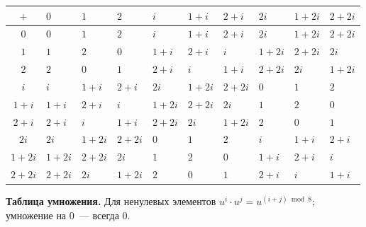 \documentclass[12pt,a4paper]{article}
\begin{document}
    \begin{center}
    	{\footnotesize
    	\begin{xltabular}{\textwidth}{|c|X|X|X|X|X|X|X|X|X|}
    		\hline
    		$+$ & $0$ & $1$ & $2$ & $i$ & $1+i$ & $2+i$ & $2i$ & $1+2i$ & $2+2i$\\
    		\hline
    		$0$ & $0$ & $1$ & $2$ & $i$ & $1+i$ & $2+i$ & $2i$ & $1+2i$ & $2+2i$\\
    		\hline
    		$1$ & $1$ & $2$ & $0$ & $1+i$ & $2+i$ & $i$ & $1+2i$ & $2+2i$ & $2i$\\
    		\hline
    		$2$ & $2$ & $0$ & $1$ & $2+i$ & $i$ & $1+i$ & $2+2i$ & $2i$ & $1+2i$\\
    		\hline
    		$i$ & $i$ & $1+i$ & $2+i$ & $2i$ & $1+2i$ & $2+2i$ & $0$ & $1$ & $2$\\
    		\hline
    		$1+i$ & $1+i$ & $2+i$ & $i$ & $1+2i$ & $2+2i$ & $2i$ & $1$ & $2$ & $0$\\
    		\hline
    		$2+i$ & $2+i$ & $i$ & $1+i$ & $2+2i$ & $2i$ & $1+2i$ & $2$ & $0$ & $1$\\
    		\hline
    		$2i$ & $2i$ & $1+2i$ & $2+2i$ & $0$ & $1$ & $2$ & $i$ & $1+i$ & $2+i$\\
    		\hline
    		$1+2i$ & $1+2i$ & $2+2i$ & $2i$ & $1$ & $2$ & $0$ & $1+i$ & $2+i$ & $i$\\
    		\hline
    		$2+2i$ & $2+2i$ & $2i$ & $1+2i$ & $2$ & $0$ & $1$ & $2+i$ & $i$ & $1+i$\\
    		\hline
    	\end{xltabular}
    	}
    \end{center}
    
    \noindent\textbf{Таблица умножения.} Для ненулевых элементов $u^i \cdot u^j = u^{(i+j)\bmod 8}$; умножение на $0$~--- всегда $0$.
    
\end{document}

